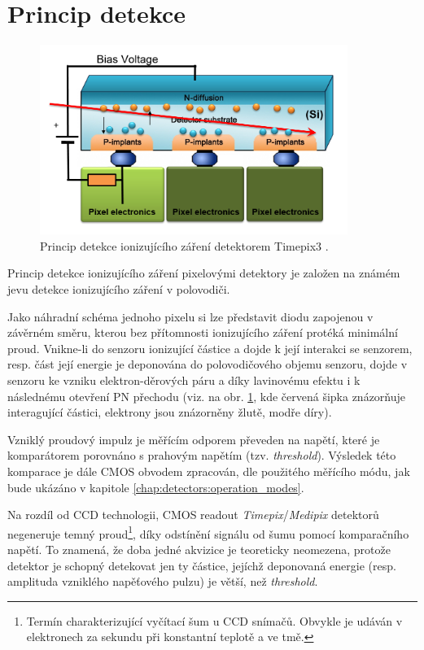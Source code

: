\section{Princip detekce}\label{chap:detectors:princip}
\begin{figure}[th]
	\begin{center}
		\includegraphics[width=10cm]{figures/det_recombination.png}
		\caption{Princip detekce ionizujícího záření detektorem Timepix3 \cite{PlatkevicDisertace}.}
		\label{fig:det:recombination}
	\end{center}
\end{figure}

Princip detekce ionizujícího záření pixelovými detektory je založen na známém jevu detekce ionizujícího záření v polovodiči. 

Jako náhradní schéma jednoho pixelu si lze představit diodu zapojenou v závěrném směru, kterou bez přítomnosti ionizujícího záření protéká minimální proud. Vnikne-li do senzoru ionizující částice a dojde k její interakci se senzorem, resp. část její energie je deponována do polovodičového objemu senzoru, dojde v senzoru ke vzniku elektron-děrových páru a díky lavinovému efektu i k následnému otevření PN přechodu (viz. na obr. \ref{fig:det:recombination}, kde červená šipka znázorňuje interagující částici, elektrony jsou znázorněny žlutě, modře díry).

Vzniklý proudový impulz je měřícím odporem převeden na napětí, které je komparátorem porovnáno s prahovým napětím (tzv. \textit{threshold}). Výsledek této komparace je dále CMOS obvodem zpracován, dle použitého měřícího módu, jak bude ukázáno v kapitole \ref{chap:detectors:operation_modes}.

Na rozdíl od CCD technologii, CMOS readout \textit{Timepix}/\textit{Medipix} detektorů negeneruje temný proud\footnote{Termín charakterizující vyčítací šum u CCD snímačů. Obvykle je udáván v elektronech za sekundu při konstantní teplotě a ve tmě.}, díky odstínění signálu od šumu pomocí komparačního napětí. To znamená, že doba jedné akvizice je teoreticky neomezena, protože detektor je schopný detekovat jen ty částice, jejíchž deponovaná energie (resp. amplituda vzniklého napěťového pulzu) je větší, než \textit{threshold}.

